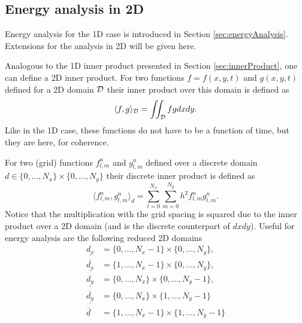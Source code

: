 \subsection{Energy analysis in 2D}\label{sec:energyAnalysis2DWave}
\def\domXred{\underline{d_x}}
\def\domYred{\underline{d_y}}
\def\domXredBoth{\underline{\overline{d_x}}}
\def\domYredBoth{\underline{\overline{d_y}}}
\def\domRedBoth{\underline{\overline{d}}}

Energy analysis for the 1D case is introduced in Section \ref{sec:energyAnalysis}. Extensions for the analysis in 2D will be given here.

Analogous to the 1D inner product presented in Section \ref{sec:innerProduct}, one can define a 2D inner product. For two functions $f = f(x,y,t)$ and $g(x,y,t)$ defined for a 2D domain $\mathcal{D}$ their inner product over this domain is defined as
\begin{equation}
    \langle f, g \rangle_{\mathcal{D}}  = \iint_{\mathcal{D}} f g dx dy.
\end{equation}
Like in the 1D case, these functions do not have to be a function of time, but they are here, for coherence. 

For two (grid) functions $f_{l,m}^n$ and $g_{l,m}^n$ defined over a discrete domain $d\in \{0, \hdots, N_x\} \times \{0, \hdots, N_y\}$ their discrete inner product is defined as
\begin{equation}\label{eq:2DInnerProd}
    \langle f^n_{l, m}, g^n_{l, m} \rangle_d = \sum_{l = 0}^{N_x}\sum_{m = 0}^{N_y} h^2 f_{l,m}^n g_{l,m}^n.
\end{equation}
Notice that the multiplication with the grid spacing is squared due to the inner product over a 2D domain (and is the discrete counterpart of $dxdy$). Useful for energy analysis are the following reduced 2D domains 
\begin{subequations}\label{eq:reduced2Ddoms}
    \begin{align}
        \domXred &= \{0, \hdots, N_x-1\} \times \{0, \hdots, N_y\}, \\
        \domXredBoth &= \{1, \hdots, N_x-1\} \times \{0, \hdots, N_y\},\\
        \domYred &= \{0, \hdots, N_x\} \times \{0, \hdots, N_y-1\},\\
        \domYredBoth &= \{0, \hdots, N_x\} \times \{1, \hdots, N_y-1\}\\
        \domRedBoth &= \{1, \hdots, N_x-1\} \times \{1, \hdots, N_y-1\}
    \end{align}  
\end{subequations}


